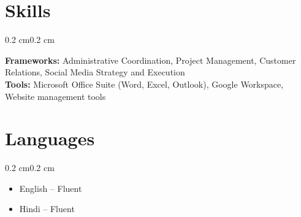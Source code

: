 \documentclass[10pt, letterpaper]{article}
\newenvironment{highlights}{%
    \begin{itemize}[
        topsep=0.10 cm,%
        parsep=0.10 cm,%
        partopsep=0pt,%
        itemsep=0pt,%
        leftmargin=0.4 cm + 10pt%
    ]
}{%
    \end{itemize}%
}
\newenvironment{onecolentry}{%
    \begin{adjustwidth}{0.2 cm}{0.2 cm}%
}{%
    \end{adjustwidth}%
}
\begin{document}
\section{Skills}
\begin{onecolentry}
    \textbf{Frameworks:} Administrative Coordination, Project Management, Customer Relations, Social Media Strategy and Execution\\
    \textbf{Tools:} Microsoft Office Suite (Word, Excel, Outlook), Google Workspace, Website management tools\\
\end{onecolentry}


\section{Languages}
\begin{onecolentry}
    \begin{highlights}
        \item English -- Fluent
        \item Hindi -- Fluent
    \end{highlights}
\end{onecolentry}
\end{document}
